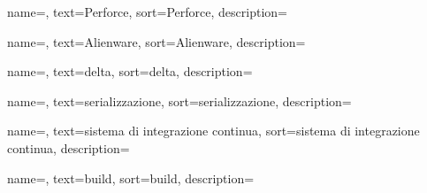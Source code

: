 {
	name=,
	text=Perforce,
	sort=Perforce,
	description={}
}

{
	name=,
	text=Alienware,
	sort=Alienware,
	description={}
}

{
	name=,
	text=delta,
	sort=delta,
	description={}
}

{
	name=,
	text=serializzazione,
	sort=serializzazione,
	description={}
}

{
	name=,
	text=sistema di integrazione continua,
	sort=sistema di integrazione continua,
	description={}
}

{
	name=,
	text=build,
	sort=build,
	description={}
}